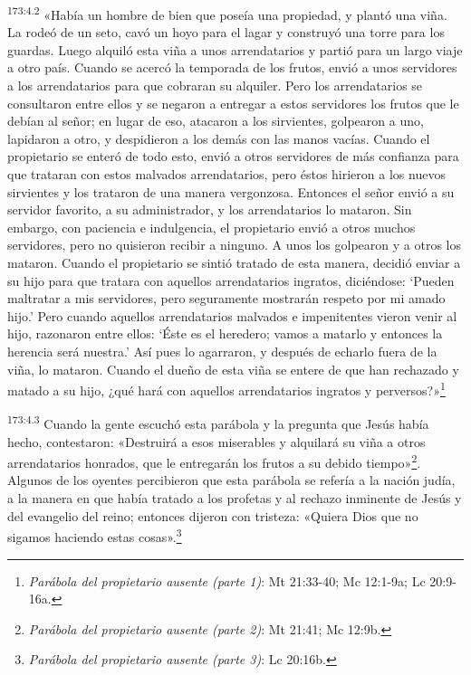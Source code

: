 \par 
\textsuperscript{173:4.2} «Había un hombre de bien que poseía una propiedad, y plantó una viña. La rodeó de un seto, cavó un hoyo para el lagar y construyó una torre para los guardas. Luego alquiló esta viña a unos arrendatarios y partió para un largo viaje a otro país. Cuando se acercó la temporada de los frutos, envió a unos servidores a los arrendatarios para que cobraran su alquiler. Pero los arrendatarios se consultaron entre ellos y se negaron a entregar a estos servidores los frutos que le debían al señor; en lugar de eso, atacaron a los sirvientes, golpearon a uno, lapidaron a otro, y despidieron a los demás con las manos vacías. Cuando el propietario se enteró de todo esto, envió a otros servidores de más confianza para que trataran con estos malvados arrendatarios, pero éstos hirieron a los nuevos sirvientes y los trataron de una manera vergonzosa. Entonces el señor envió a su servidor favorito, a su administrador, y los arrendatarios lo mataron. Sin embargo, con paciencia e indulgencia, el propietario envió a otros muchos servidores, pero no quisieron recibir a ninguno. A unos los golpearon y a otros los mataron. Cuando el propietario se sintió tratado de esta manera, decidió enviar a su hijo para que tratara con aquellos arrendatarios ingratos, diciéndose: `Pueden maltratar a mis servidores, pero seguramente mostrarán respeto por mi amado hijo.' Pero cuando aquellos arrendatarios malvados e impenitentes vieron venir al hijo, razonaron entre ellos: `Éste es el heredero; vamos a matarlo y entonces la herencia será nuestra.' Así pues lo agarraron, y después de echarlo fuera de la viña, lo mataron. Cuando el dueño de esta viña se entere de que han rechazado y matado a su hijo, ¿qué hará con aquellos arrendatarios ingratos y perversos?»\footnote{\textit{Parábola del propietario ausente (parte 1)}: Mt 21:33-40; Mc 12:1-9a; Lc 20:9-16a.}

\par 
\textsuperscript{173:4.3} Cuando la gente escuchó esta parábola y la pregunta que Jesús había hecho, contestaron: «Destruirá a esos miserables y alquilará su viña a otros arrendatarios honrados, que le entregarán los frutos a su debido tiempo»\footnote{\textit{Parábola del propietario ausente (parte 2)}: Mt 21:41; Mc 12:9b.}. Algunos de los oyentes percibieron que esta parábola se refería a la nación judía, a la manera en que había tratado a los profetas y al rechazo inminente de Jesús y del evangelio del reino; entonces dijeron con tristeza: «Quiera Dios que no sigamos haciendo estas cosas».\footnote{\textit{Parábola del propietario ausente (parte 3)}: Lc 20:16b.}

